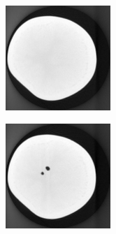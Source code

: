 \documentclass[journal]{IEEEtran}
\begin{document}
\begin{figure}[!h]
    \begin{subfigure}[b]{0.24\linewidth}
        \includegraphics[width=\textwidth]{../images/potato/template_1.png}
\captionsetup{labelformat=empty}       
 \caption{}
    \end{subfigure}
    \begin{subfigure}[b]{0.24\linewidth}
        \includegraphics[width=\textwidth]{../images/potato/template_2.png}

\end{subfigure}
\end{figure}
\end{document}
